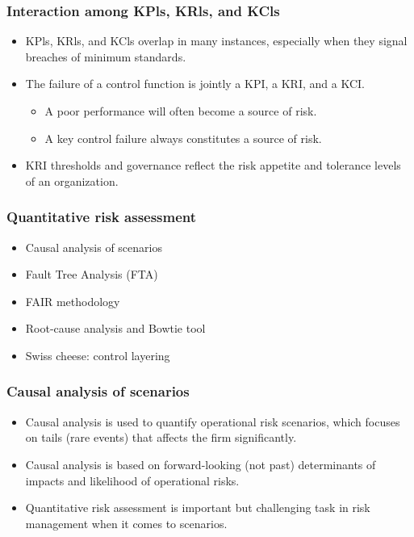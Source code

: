 \subsubsection{Interaction among KPls, KRls, and KCls }
\begin{itemize}
\item KPls, KRls, and KCls overlap in many instances, especially when they signal breaches of minimum standards.
\item  The failure of a control function is jointly a KPI, a KRI, and a KCI.
    \begin{itemize}
    \item  A poor performance will often become a source of risk.
    \item  A key control failure always constitutes a source of risk.
    \end{itemize}

\item  KRI thresholds and governance reflect the risk appetite and tolerance levels of an organization.
\end{itemize}

\subsubsection{Quantitative risk assessment}
\begin{itemize}
\item Causal analysis of scenarios
\item  Fault Tree Analysis (FTA)
\item  FAIR methodology
\item  Root-cause analysis and Bowtie tool
\item  Swiss cheese: control layering
\end{itemize}

\subsubsection{Causal analysis of scenarios}
\begin{itemize}
\item Causal analysis is used to quantify operational risk scenarios, which focuses on tails (rare events) that affects the firm significantly.
\item  Causal analysis is based on forward-looking (not past) determinants of impacts and likelihood of operational risks.
\item  Quantitative risk assessment is important but challenging task in risk management when it comes to scenarios.
\end{itemize}

